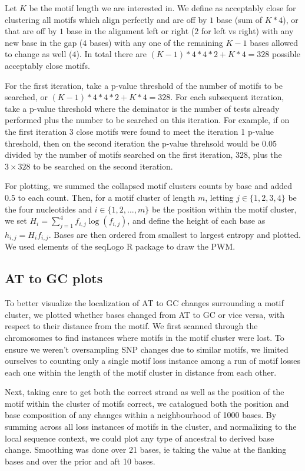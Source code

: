 \documentclass{article}\usepackage[]{graphicx}\usepackage[]{color}
\begin{document}
Let $K$ be the motif length we are interested in. We define as acceptably close for clustering all motifs which align perfectly and are off by $1$ base (sum of $K*4$), or that are off by $1$ base in the alignment left or right ($2$ for left vs right) with any new base in the gap ($4$ bases) with any one of the remaining $K-1$ bases allowed to change as well ($4$). In total there are $(K-1)*4*4*2+K*4 = 328$ possible acceptably close motifs.

For the first iteration, take a p-value threshold of the number of motifs to be searched, or $(K-1)*4*4*2+K*4 = 328$. For each subsequent iteration, take a p-value threshold where the deminator is the number of tests already performed plus the number to be searched on this iteration. For example, if on the first iteration $3$ close motifs were found to meet the iteration 1 p-value threshold, then on the second iteration the p-value threhsold would be $0.05$ divided by the number of motifs searched on the first iteration, $328$, plus the $3\times328$ to be searched on the second iteration.


For plotting, we summed the collapsed motif clusters counts by base and added 0.5 to each count. Then, for a motif cluster of length $m$, letting $j \in \{1,2,3,4\}$ be the four nucleotides and $i \in \{1,2,...,m\}$ be the position within the motif cluster, we set $H_i = \sum_{j=1}^4 f_{i,j} \log(f_{i,j})$, and define the height of each base as $h_{i,j}=H_{i} f_{i,j}$. Bases are then ordered from smallest to largest entropy and plotted. We used elements of the seqLogo R package to draw the PWM.



\subsection*{AT to GC plots}
To better visualize the localization of AT to GC changes surrounding a motif cluster, we plotted whether bases changed from AT to GC or vice versa, with respect to their distance from the motif. We first scanned through the chromosomes to find instances where motifs in the motif cluster were lost. To ensure we weren't oversampling SNP changes due to similar motifs, we limited ourselves to counting only a single motif loss instance among a run of motif losses each one within the length of the motif cluster in distance from each other. 

Next, taking care to get both the correct strand as well as the position of the motif within the cluster of motifs correct, we catalogued both the position and base composition of any changes within a neighbourhood of 1000 bases. By summing across all loss instances of motifs in the cluster, and normalizing to the local sequence context, we could plot any type of ancestral to derived base change. Smoothing was done over 21 bases, ie taking the value at the flanking bases and over the prior and aft 10 bases. 
\end{document}
